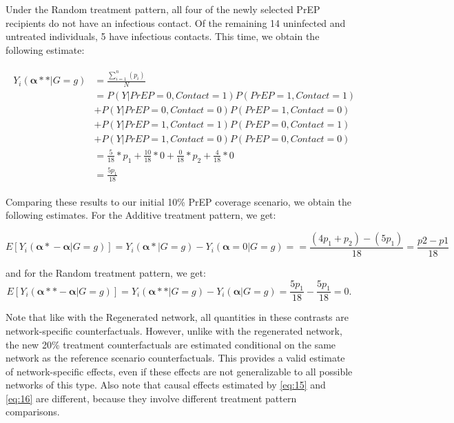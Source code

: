 \documentclass{article}
\theoremstyle{definition}
\begin{document}
Under the Random treatment pattern, all four of the newly selected PrEP recipients do not have an infectious contact. Of the remaining 14 uninfected and untreated individuals, 5 have infectious contacts. This time, we obtain the following estimate: 

\begin{align}\label{eq:14}
\begin{split}
Y_{i}\left(\mathbf{\alpha**}|G=g\right) & = \frac{\sum_{i=1}^{n}(p_{i})}{N}  \\ 
& = P\left(Y|PrEP = 0, Contact = 1\right)P\left(PrEP = 1, Contact = 1\right)  \\ \nonumber
& +P\left(Y|PrEP = 0, Contact = 0\right)P\left(PrEP = 1, Contact = 0\right)  \\ \nonumber
& +P\left(Y|PrEP = 1, Contact = 1\right)P\left(PrEP = 0, Contact = 1\right) \\ \nonumber
&  +P\left(Y|PrEP = 1, Contact = 0\right)P\left(PrEP = 0, Contact = 0\right)\\ \nonumber
 &= \frac{5}{18}*p_1 +  \frac{10}{18}*0+\frac{0}{18}*p_2 +  \frac{4}{18}*0  \\ \nonumber
 &=\frac{5p_1}{18}  \nonumber
 \end{split}
\end{align}

Comparing these results to our initial 10\% PrEP coverage scenario, we obtain the following estimates. For the Additive treatment pattern, we get:

\begin{equation}\label{eq:15}
E\left[Y_{i}\left(\mathbf{\alpha*}-\mathbf{\alpha}|G=g\right)\right] =  Y_{i}\left(\mathbf{\alpha*}|G=g\right) -Y_{i}\left(\mathbf{\alpha}= 0|G=g\right) = 
= \frac{\left(4p_1+p_2\right)-\left(5p_1\right)}{18}=
\frac{p2-p1}{18}
\end{equation}

and for the Random treatment pattern, we get:
\begin{equation}\label{eq:16}
E\left[Y_{i}\left(\mathbf{\alpha**}-\mathbf{\alpha}|G=g\right)\right] =Y_{i}\left(\mathbf{\alpha**}|G=g\right) -Y_{i}\left(\mathbf{\alpha}|G=g\right) = \frac{5p_1}{18} - \frac{5p_1}{18} =0.
\end{equation}

Note that like with the Regenerated network, all quantities in these contrasts are network-specific counterfactuals. However, unlike with the regenerated network, the new 20\% treatment counterfactuals are estimated conditional on the same network as the reference scenario counterfactuals. This provides a valid estimate of network-specific effects, even if these effects are not generalizable to all possible networks of this type. Also note that causal effects estimated by \ref{eq:15} and \ref{eq:16} are different, because they involve different treatment pattern comparisons.
\end{document}
